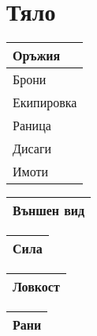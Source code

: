 \documentclass{article}
\begin{document}
\section{Тяло}
\begin{multicols}{2}
\extrarowsep=3.8cm
\noindent
\begin{tabular}{|p{8cm}|}
\hline
{\tiny Оръжия}  \\
\hline
{\tiny Брони}  \\
\hline
{\tiny Екипировка}  \\
\hline
{\tiny Раница}  \\
\hline
{\tiny Дисаги}  \\
\hline
{\tiny Имоти}  \\
\hline
\end{tabular}

\extrarowsep=4cm
\noindent
\begin{tabular}{|p{}|}
\hline
{\tiny Външен вид}  \\
\hline
\end{tabular}

\begin{multicols}{2}
\extrarowsep=1cm
\begin{tabular}{|p{2cm}|}
\hline
{\tiny Сила}  \\
\hline
\end{tabular}

\extrarowsep=1cm
\begin{tabular}{|p{2cm}|}
\hline
{\tiny Ловкост}  \\
\hline
\end{tabular}

\extrarowsep=4cm
\noindent
\begin{tabular}{|p{4cm}|}
\hline
{\tiny Рани}  \\
\hline
\end{tabular}
\end{multicols}


\end{multicols}
\end{document}
